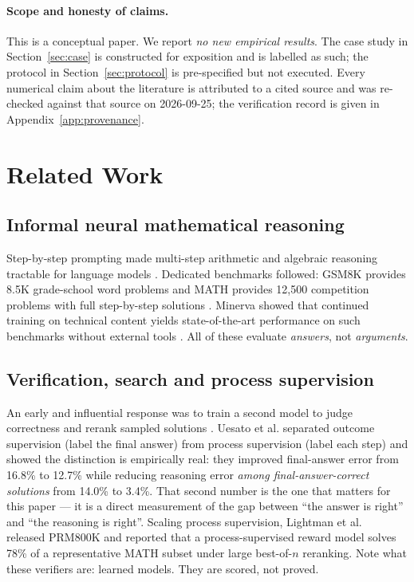 \documentclass[11pt,a4paper]{article}
\theoremstyle{plain}
\theoremstyle{remark}
\begin{document}
\paragraph{Scope and honesty of claims.}
This is a conceptual paper.  We report \emph{no new empirical results}.  The
case study in Section~\ref{sec:case} is constructed for exposition and is
labelled as such; the protocol in Section~\ref{sec:protocol} is pre-specified
but not executed.  Every numerical claim about the literature is attributed to
a cited source and was re-checked against that source on 2026-09-25; the
verification record is given in Appendix~\ref{app:provenance}.

\section{Related Work}
\label{sec:related}

\subsection{Informal neural mathematical reasoning}
Step-by-step prompting made multi-step arithmetic and algebraic reasoning
tractable for language models \cite{wei2022cot}.  Dedicated benchmarks followed:
GSM8K provides 8.5K grade-school word problems \cite{cobbe2021gsm8k} and MATH
provides 12,500 competition problems with full step-by-step solutions
\cite{hendrycks2021math}.  Minerva showed that continued training on technical
content yields state-of-the-art performance on such benchmarks without external
tools \cite{lewkowycz2022minerva}.  All of these evaluate \emph{answers}, not
\emph{arguments}.

\subsection{Verification, search and process supervision}
An early and influential response was to train a second model to judge
correctness and rerank sampled solutions \cite{cobbe2021gsm8k}.  Uesato et al.
\cite{uesato2022process} separated outcome supervision (label the final answer)
from process supervision (label each step) and showed the distinction is
empirically real: they improved final-answer error from 16.8\% to 12.7\% while
reducing reasoning error \emph{among final-answer-correct solutions} from
14.0\% to 3.4\%.  That second number is the one that matters for this paper --- it
is a direct measurement of the gap between ``the answer is right'' and ``the
reasoning is right''.  Scaling process supervision, Lightman et al.\
\cite{lightman2023letsverify} released PRM800K and reported that a
process-supervised reward model solves 78\% of a representative MATH subset
under large best-of-$n$ reranking.  Note what these verifiers are: learned
models.  They are scored, not proved.
\end{document}
